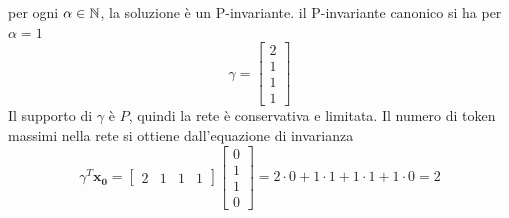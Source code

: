 \documentclass[10pt, letterpaper]{report}
\begin{document}
per ogni $\alpha\in {\mathbb N}$, la soluzione è un P-invariante. il P-invariante canonico si ha per $\alpha=1$
 $$\gamma=
\begin{bmatrix}
    2 \\ 
    1 \\ 
    1\\ 
   1
\end{bmatrix}$$
Il supporto di $\gamma$ è $P$, quindi la rete è conservativa e limitata. 
Il numero di token massimi nella rete si ottiene dall'equazione di invarianza 
$$ \gamma^T\mathbf{x_0}=\begin{bmatrix}
    2 & 
    1  &
    1 &
   1
\end{bmatrix}\begin{bmatrix}
    0\\ 1\\ 1\\ 0 
\end{bmatrix}=2\cdot 0 + 1 \cdot 1 + 1 \cdot 1 + 1 \cdot 0 = 2$$
\end{document}
